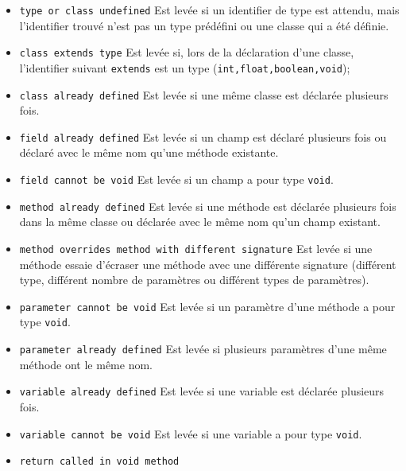 \documentclass[a4paper, 10pt, french]{article}
\begin{document}
\begin{itemize}
\item \texttt{type or class undefined} \newline
Est levée si un identifier de type est attendu, mais l'identifier trouvé n'est pas un type prédéfini ou une classe qui a été définie.
\item \texttt{class extends type}
\newline
Est levée si, lors de la déclaration d'une classe, l'identifier suivant \texttt{extends} est un type (\texttt{int,float,boolean,void});
\item \texttt{class already defined}
\newline
Est levée si une même classe est déclarée plusieurs fois.
\item \texttt{field already defined}
\newline
Est levée si un champ est déclaré plusieurs fois ou déclaré avec le même nom qu'une méthode existante.
\item \texttt{field cannot be void}
\newline
Est levée si un champ a pour type \texttt{void}.
\item \texttt{method already defined}
\newline
Est levée si une méthode est déclarée plusieurs fois dans la même classe ou déclarée avec le même nom qu'un champ existant.
\item \texttt{method overrides method with different signature}
\newline
Est levée si une méthode essaie d'écraser une méthode avec une différente signature (différent type, différent nombre de paramètres ou diff\'erent types de paramètres).
\item \texttt{parameter cannot be void}
\newline
Est levée si un paramètre d'une méthode a pour type \texttt{void}.
\item \texttt{parameter already defined}
\newline
Est levée si plusieurs paramètres d'une même méthode ont le même nom.
\item \texttt{variable already defined}
\newline
Est levée si une variable est déclarée plusieurs fois.
\item \texttt{variable cannot be void}
\newline
Est levée si une variable a pour type \texttt{void}.
\item \texttt{return called in void method}
\newline 

\end{itemize}
\end{document}
